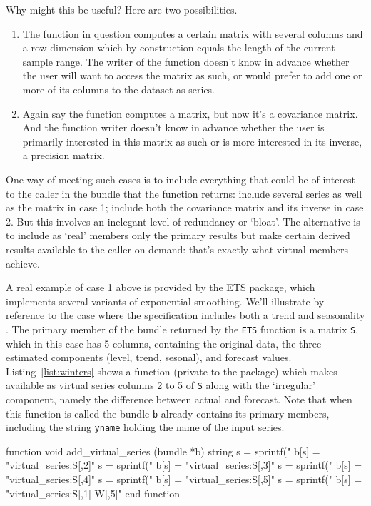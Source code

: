 \documentclass[oneside]{book}
\begin{document}
Why might this be useful? Here are two possibilities.
\begin{enumerate}
\item The function in question computes a certain matrix with several
  columns and a row dimension which by construction equals the length of
  the current sample range. The writer of the function doesn't know in
  advance whether the user will want to access the matrix as such, or
  would prefer to add one or more of its columns to the dataset as
  series.
\item Again say the function computes a matrix, but now it's a
  covariance matrix. And the function writer doesn't know in advance
  whether the user is primarily interested in this matrix as such or is
  more interested in its inverse, a precision matrix.\label{case2}
\end{enumerate}

One way of meeting such cases is to include everything that could be of
interest to the caller in the bundle that the function returns: include
several series as well as the matrix in case 1; include both the
covariance matrix and its inverse in case 2. But this involves an
inelegant level of redundancy or `bloat'. The alternative is to include
as `real' members only the primary results but make certain derived
results available to the caller on demand: that's exactly what virtual
members achieve.

A real example of case 1 above is provided by the \textsf{ETS} package,
which implements several variants of exponential smoothing.  We'll
illustrate by reference to the case where the specification includes
both a trend and seasonality \citep{winters60}.  The primary member of
the bundle returned by the \texttt{ETS} function is a matrix \texttt{S},
which in this case has 5 columns, containing the original data, the
three estimated components (level, trend, sesonal), and forecast values.
Listing~\ref{list:winters} shows a function (private to the package)
which makes available as virtual series columns 2 to 5 of \texttt{S}
along with the `irregular' component, namely the difference between
actual and forecast.  Note that when this function is called the bundle
\texttt{b} already contains its primary members, including the string
\texttt{yname} holding the name of the input series.

\begin{script}[p]
\begin{scode}
function void add_virtual_series (bundle *b)
   string s = sprintf("%
   b[s] = "virtual_series:S[,2]"
   s = sprintf("%
   b[s] = "virtual_series:S[,3]"
   s = sprintf("%
   b[s] = "virtual_series:S[,4]"
   s = sprintf("%
   b[s] = "virtual_series:S[,5]"
   s = sprintf("%
   b[s] = "virtual_series:S[,1]-W[,5]"
end function
\end{scode}
  \caption{Hansl code that adds virtual series to a bundle}
  \label{list:winters}
\end{script}
\end{document}
